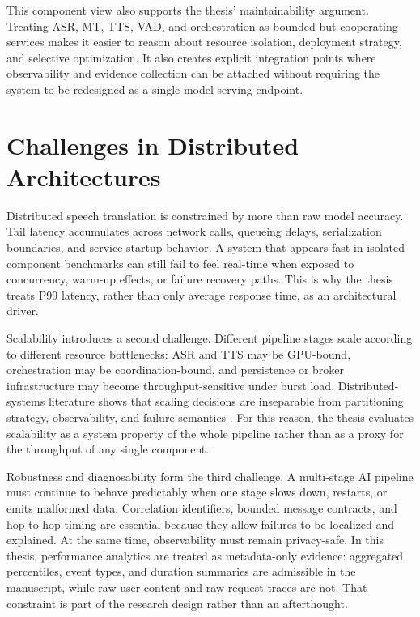 This component view also supports the thesis' maintainability argument. Treating ASR, MT, TTS, VAD, and orchestration as bounded but cooperating services makes it easier to reason about resource isolation, deployment strategy, and selective optimization. It also creates explicit integration points where observability and evidence collection can be attached without requiring the system to be redesigned as a single model-serving endpoint.

\section{Challenges in Distributed Architectures}
\label{sec:distributed_challenges}

Distributed speech translation is constrained by more than raw model accuracy. Tail latency accumulates across network calls, queueing delays, serialization boundaries, and service startup behavior. A system that appears fast in isolated component benchmarks can still fail to feel real-time when exposed to concurrency, warm-up effects, or failure recovery paths. This is why the thesis treats P99 latency, rather than only average response time, as an architectural driver.

Scalability introduces a second challenge. Different pipeline stages scale according to different resource bottlenecks: ASR and TTS may be GPU-bound, orchestration may be coordination-bound, and persistence or broker infrastructure may become throughput-sensitive under burst load. Distributed-systems literature shows that scaling decisions are inseparable from partitioning strategy, observability, and failure semantics \cite{kleppmann2017designing,bass2021softwarearchitectureinpractice,kubernetes2023}. For this reason, the thesis evaluates scalability as a system property of the whole pipeline rather than as a proxy for the throughput of any single component.

Robustness and diagnosability form the third challenge. A multi-stage AI pipeline must continue to behave predictably when one stage slows down, restarts, or emits malformed data. Correlation identifiers, bounded message contracts, and hop-to-hop timing are essential because they allow failures to be localized and explained. At the same time, observability must remain privacy-safe. In this thesis, performance analytics are treated as metadata-only evidence: aggregated percentiles, event types, and duration summaries are admissible in the manuscript, while raw user content and raw request traces are not. That constraint is part of the research design rather than an afterthought.

